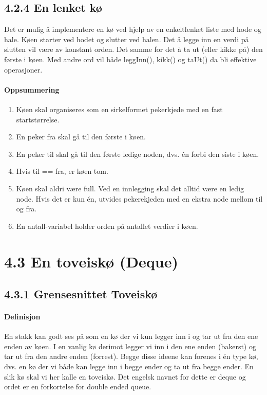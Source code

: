\documentclass[11pt]{article}
\begin{document}
    \subsection{4.2.4 En lenket kø}
        Det er mulig å implementere en kø ved hjelp av en enkeltlenket liste med hode og hale. Køen
        starter ved hodet og slutter ved halen. Det å legge inn en verdi på slutten vil være av
        konstant orden. Det samme for det å ta ut (eller kikke på) den første i køen. Med andre ord
        vil både leggInn(), kikk() og taUt() da bli effektive operasjoner.

        \paragraph{Oppsummering}
        \begin{enumerate}
            \item Køen skal organiseres som en sirkelformet pekerkjede med en fast startstørrelse.
            \item En peker fra skal gå til den første i køen.
            \item En peker til skal gå til den første ledige noden, dvs. én forbi den siste i køen.
            \item Hvis til == fra, er køen tom.
            \item Køen skal aldri være full. Ved en innlegging skal det alltid være en ledig node. Hvis det
            er kun én, utvides pekerekjeden med en ekstra node mellom til og fra.
            \item En antall-variabel holder orden på antallet verdier i køen.
        \end{enumerate}

\newpage
\section{4.3 En toveiskø (Deque)}
    \subsection{4.3.1 Grensesnittet Toveiskø}
        
        \paragraph{Definisjon}
        En stakk kan godt ses på som en kø der vi kun legger inn i og tar ut fra den ene enden av
        køen. I en vanlig kø derimot legger vi inn i den ene enden (bakerst) og tar ut fra den andre
        enden (forrest). Begge disse ideene kan forenes i én type kø, dvs. en kø der vi både kan
        legge inn i begge ender og ta ut fra begge ender. En slik kø skal vi her kalle en toveiskø. Det
        engelsk navnet for dette er deque og ordet er en forkortelse for double ended queue.
\end{document}
